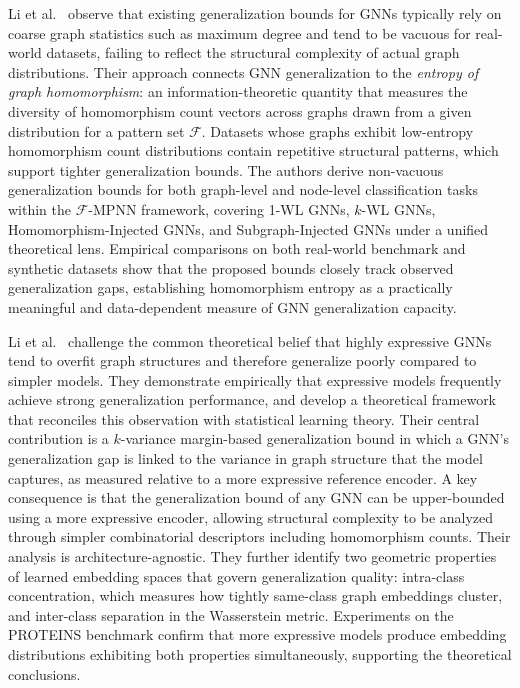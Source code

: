 \documentclass[12pt]{article}
\begin{document}
Li et al.~\cite{li2024generalization} observe that existing generalization bounds for
GNNs typically rely on coarse graph statistics such as maximum degree and tend to
be vacuous for real-world datasets, failing to reflect the structural complexity
of actual graph distributions. Their approach connects GNN generalization to the
\textit{entropy of graph homomorphism}: an information-theoretic quantity that
measures the diversity of homomorphism count vectors across graphs drawn from a
given distribution for a pattern set $\mathcal{F}$. Datasets whose graphs exhibit
low-entropy homomorphism count distributions contain repetitive structural
patterns, which support tighter generalization bounds. The authors derive
non-vacuous generalization bounds for both graph-level and node-level
classification tasks within the $\mathcal{F}$-MPNN framework, covering 1-WL
GNNs, $k$-WL GNNs, Homomorphism-Injected GNNs, and Subgraph-Injected GNNs under
a unified theoretical lens. Empirical comparisons on both real-world benchmark and
synthetic datasets show that the proposed bounds closely track observed
generalization gaps, establishing homomorphism entropy as a practically
meaningful and data-dependent measure of GNN generalization capacity.

Li et al.~\cite{li2025towards} challenge the common theoretical belief that highly
expressive GNNs tend to overfit graph structures and therefore generalize poorly
compared to simpler models. They demonstrate empirically that expressive models
frequently achieve strong generalization performance, and develop a theoretical
framework that reconciles this observation with statistical learning theory. Their
central contribution is a $k$-variance margin-based generalization bound in which
a GNN's generalization gap is linked to the variance in graph structure that the
model captures, as measured relative to a more expressive reference encoder. A key
consequence is that the generalization bound of any GNN can be upper-bounded using
a more expressive encoder, allowing structural complexity to be analyzed through
simpler combinatorial descriptors including homomorphism counts. Their analysis is
architecture-agnostic. They further identify two geometric properties of learned
embedding spaces that govern generalization quality: intra-class concentration,
which measures how tightly same-class graph embeddings cluster, and inter-class
separation in the Wasserstein metric. Experiments on the PROTEINS benchmark
confirm that more expressive models produce embedding distributions exhibiting
both properties simultaneously, supporting the theoretical conclusions.
\end{document}
